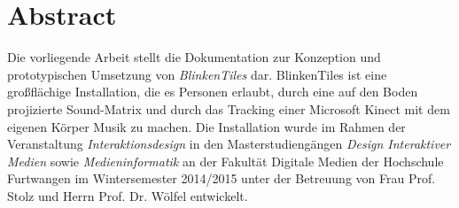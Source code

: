 \section*{Abstract}
Die vorliegende Arbeit stellt die Dokumentation zur Konzeption und prototypischen Umsetzung von \emph{BlinkenTiles} dar. BlinkenTiles ist eine großflächige Installation, die es Personen erlaubt, durch eine auf den Boden projizierte Sound-Matrix und durch das Tracking einer Microsoft Kinect mit dem eigenen Körper Musik zu machen. Die Installation wurde im Rahmen der Veranstaltung \textit{Interaktionsdesign} in den Masterstudiengängen \textit{Design Interaktiver Medien} sowie \textit{Medieninformatik} an der Fakultät Digitale Medien der Hochschule Furtwangen im Wintersemester 2014/2015 unter der Betreuung von Frau Prof. Stolz und Herrn Prof. Dr. Wölfel entwickelt.
